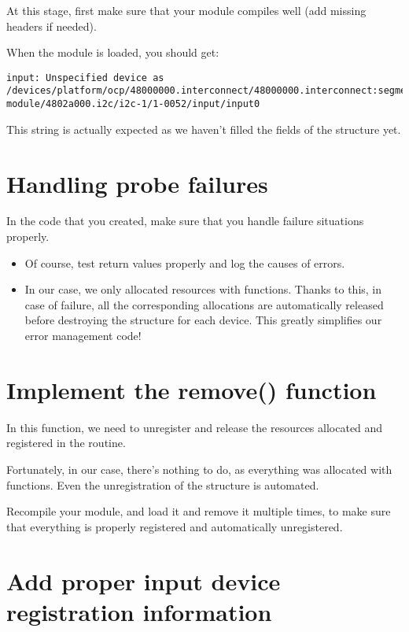 At this stage, first make sure that your module compiles well (add
missing headers if needed).

When the module is loaded, you should get:
\begin{verbatim}
input: Unspecified device as /devices/platform/ocp/48000000.interconnect/48000000.interconnect:segment@0/4802a000.target-module/4802a000.i2c/i2c-1/1-0052/input/input0
\end{verbatim}

This  string is actually expected
as we haven't filled the fields of the  structure yet.

\section{Handling probe failures}

In the code that you created, make sure that you handle failure
situations properly.

\begin{itemize}
\item Of course, test return values properly and log
      the causes of errors.
\item In our case, we only allocated resources with 
      functions. Thanks to this, in case of failure, all the
      corresponding allocations are automatically released
      before destroying the  structure for each
      device. This greatly simplifies our error management code!
\end{itemize}

\section{Implement the remove() function}

In this function, we need to unregister and release the resources allocated
and registered in the  routine.

Fortunately, in our case, there's nothing to do, as everything
was allocated with  functions. Even the unregistration
of the  structure is automated. 

Recompile your module, and load it and remove it multiple times, to
make sure that everything is properly registered and automatically
unregistered.

\section{Add proper input device registration information}

